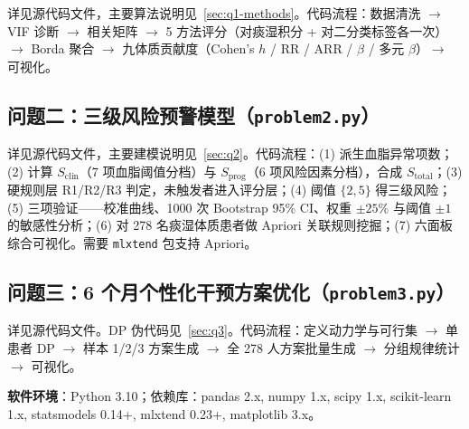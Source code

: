 \documentclass{MathorCupmodeling}
\begin{document}
详见源代码文件，主要算法说明见~\cref{sec:q1-methods}。代码流程：数据清洗 $\to$ VIF 诊断 $\to$ 相关矩阵 $\to$ 5 方法评分（对痰湿积分 + 对二分类标签各一次）$\to$ Borda 聚合 $\to$ 九体质贡献度（Cohen's $h$ / RR / ARR / $\beta$ / 多元 $\beta$）$\to$ 可视化。\subsection{问题二：三级风险预警模型（\texttt{problem2.py}）}

详见源代码文件，主要建模说明见~\cref{sec:q2}。代码流程：(1) 派生血脂异常项数；(2) 计算 $S_{\text{clin}}$（7 项血脂阈值分档）与 $S_{\text{prog}}$（6 项风险因素分档），合成 $S_{\text{total}}$；(3) 硬规则层 R1/R2/R3 判定，未触发者进入评分层；(4) 阈值 $\{2, 5\}$ 得三级风险；(5) 三项验证——校准曲线、1000 次 Bootstrap 95\% CI、权重 $\pm 25\%$ 与阈值 $\pm 1$ 的敏感性分析；(6) 对 278 名痰湿体质患者做 Apriori 关联规则挖掘；(7) 六面板综合可视化。需要 \texttt{mlxtend} 包支持 Apriori。

\subsection{问题三：6 个月个性化干预方案优化（\texttt{problem3.py}）}

详见源代码文件。DP 伪代码见~\cref{sec:q3}。代码流程：定义动力学与可行集 $\to$ 单患者 DP $\to$ 样本 1/2/3 方案生成 $\to$ 全 278 人方案批量生成 $\to$ 分组规律统计 $\to$ 可视化。

\textbf{软件环境}：Python 3.10；依赖库：pandas 2.x, numpy 1.x, scipy 1.x, scikit-learn 1.x, statsmodels 0.14+, mlxtend 0.23+, matplotlib 3.x。
\end{document}
